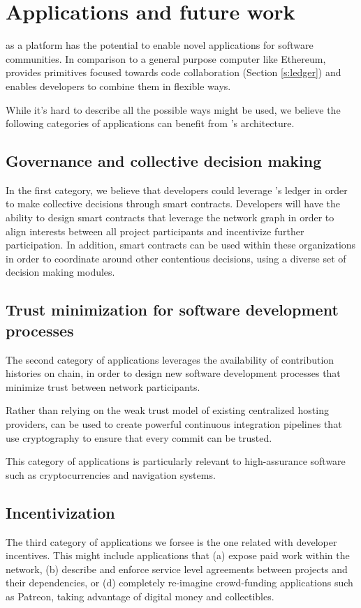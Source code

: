 
\section{Applications and future work}

\oscoin{} as a platform has the potential to enable novel applications for
software communities. In comparison to a general purpose computer like
Ethereum, \oscoin{} provides primitives focused towards code collaboration
(Section \ref{s:ledger}) and enables developers to combine them in flexible ways.

While it’s hard to describe all the possible ways \oscoin{} might be used, we
believe the following categories of applications can benefit from \oscoin{}’s
architecture.

\subsection{Governance and collective decision making}

In the first category, we believe that developers could leverage \oscoin{}’s
ledger in order to make collective decisions through smart contracts. Developers 
will have the ability to design smart contracts that leverage the network graph in 
order to align interests between all project participants and incentivize further 
participation. In addition, smart contracts can be used within these organizations 
in order to coordinate around other contentious decisions, using a diverse set of 
decision making modules.

\subsection{Trust minimization for software development processes}
The second category of applications leverages the availability of contribution
histories on chain, in order to design new software development processes that
minimize trust between network participants.

Rather than relying on the weak trust model of existing centralized hosting
providers, \oscoin{} can be used to create powerful continuous integration
pipelines that use cryptography to ensure that every commit can be trusted.

This category of applications is particularly relevant to high-assurance
software such as cryptocurrencies and navigation systems.

\subsection{Incentivization}
The third category of applications we forsee is the one related with
developer incentives. This might include applications that (a) expose paid work
within the \oscoin{} network, (b) describe and enforce service level agreements
between projects and their dependencies, or (d) completely re-imagine crowd-funding
applications such as Patreon, taking advantage of digital money and collectibles.

